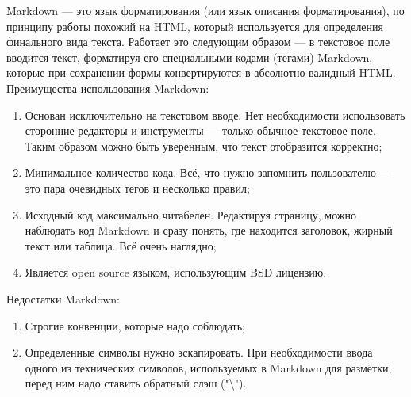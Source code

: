Markdown — это язык форматирования (или язык описания форматирования), по принципу работы похожий на HTML, который используется для определения финального вида текста.
Работает это следующим образом — в текстовое поле вводится текст, форматируя его специальными кодами (тегами) Markdown, которые при сохранении формы конвертируются в абсолютно валидный HTML.
Преимущества использования Markdown:

\begin{enumerate}
  \item Основан исключительно на текстовом вводе. Нет необходимости использовать сторонние редакторы и инструменты — только обычное текстовое поле. Таким образом можно быть уверенным, что текст отобразится корректно;
  \item Минимальное количество кода. Всё, что нужно запомнить пользователю — это пара очевидных тегов и несколько правил;
  \item Исходный код максимально читабелен. Редактируя страницу, можно наблюдать код Markdown и сразу понять, где находится заголовок, жирный текст или таблица. Всё очень наглядно;
  \item Является open source языком, использующим BSD лицензию.
\end{enumerate}

Недостатки Markdown:

\begin{enumerate}
  \item Строгие конвенции, которые надо соблюдать;
  \item Определенные символы нужно эскапировать. При необходимости ввода одного из технических символов, используемых в Markdown для размётки, перед ним надо ставить обратный слэш ("\textbackslash").
\end{enumerate}
